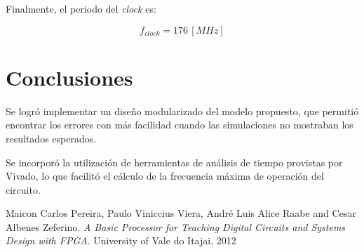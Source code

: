 \documentclass[12pt,a4paper]{article}
\begin{document}
Finalmente, el periodo del \emph{clock} es:

\begin{equation}
f_{clock} = 176\,[MHz]
\end{equation}

\section{Conclusiones}
\label{concu}

Se logró implementar un diseño modularizado del modelo propuesto, que permitió encontrar los errores con más facilidad cuando las simulaciones no mostraban los resultados esperados.

Se incorporó la utilización de herramientas de análisis de tiempo provistas por Vivado, lo que facilitó el cálculo de la frecuencia máxima de operación del circuito.

\begin{thebibliography}{9}

Maicon Carlos Pereira, Paulo Viniccius Viera, André Luis Alice Raabe and Cesar Albenes Zeferino. \emph{A Basic Processor for Teaching
Digital Circuits and Systems Design with FPGA}. University of Vale do Itajai, 2012 \\

\end{thebibliography}
\end{document}

